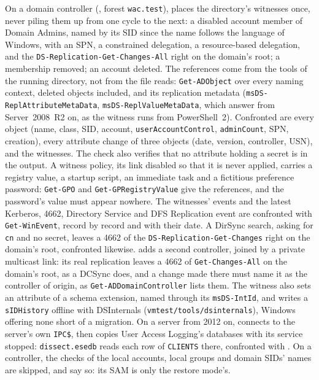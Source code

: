 \documentclass[11pt,a4paper,oneside]{report}
\begin{document}
On a domain controller (, forest
\texttt{wac.test}),  places the
directory's witnesses once, never piling them up from one cycle to the next: a
disabled account member of Domain Admins, named by its SID since the name
follows the language of Windows, with an SPN, a constrained delegation, a
resource-based delegation, and the \texttt{DS-Replication-Get-Changes-All}
right on the domain's root; a membership removed; an account deleted. The
references come from the tools of the running directory, not from the file
\wac{} reads: \texttt{Get-ADObject} over every naming context, deleted objects
included, and its replication metadata (\texttt{msDS-ReplAttributeMetaData},
\texttt{msDS-ReplValueMetaData}, which answer from Server~2008~R2 on, as the
witness runs from PowerShell~2). Confronted are every
object (name, class, SID, account, \texttt{userAccountControl},
\texttt{adminCount}, SPN, creation), every attribute change of three objects
(date, version, controller, USN), and the witnesses. The check also verifies
that no attribute holding a secret is in the output. A witness policy, its link
disabled so that it is never applied, carries a registry value, a startup
script, an immediate task and a fictitious preference password:
\texttt{Get-GPO} and \texttt{Get-GPRegistryValue} give the references, and the
password's value must appear nowhere. The witnesses' events and the latest
Kerberos, 4662, Directory Service and DFS Replication event are confronted with
\texttt{Get-WinEvent}, record by record and with their date. A DirSync search,
asking for \texttt{cn} and no secret, leaves a 4662 of the
\texttt{DS-Replication-Get-Changes} right on the domain's root, confronted
likewise.  adds a second controller,
joined by a private multicast link: its real replication leaves a 4662 of
\texttt{Get-Changes-All} on the domain's root, as a DCSync does, and a change made
there must name it as the controller of origin, as
\texttt{Get-ADDomainController} lists them. The witness also sets an attribute of
a schema extension, named through its \texttt{msDS-IntId}, and
 writes a \texttt{sIDHistory} offline with DSInternals
(\texttt{vmtest/tools/dsinternals}), Windows offering none short of a migration.
On a server from 2012 on,  connects to
the server's own \texttt{IPC\$}, then copies User Access Logging's databases with
its service stopped: \texttt{dissect.esedb} reads each row of \texttt{CLIENTS}
there, confronted with . On a controller, the checks of the local
accounts, local groups and domain SIDs' names are skipped, and say so: its SAM
is only the restore mode's.
\end{document}
